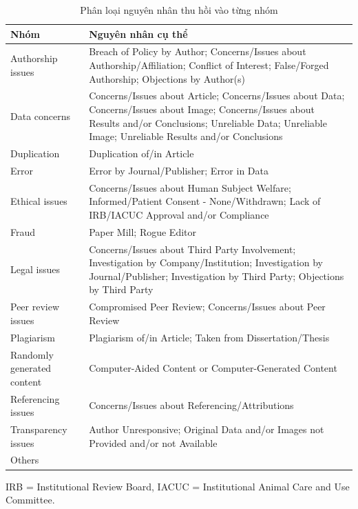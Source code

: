 \begin{table}[H]
\centering
\caption{Phân loại nguyên nhân thu hồi vào từng nhóm}
\label{tab:reason_category}
\small
\begin{tabularx}{\textwidth}{>{\hsize=0.28\hsize\raggedright\arraybackslash}X >{\hsize=1.72\hsize\raggedright\arraybackslash}X}
\toprule
\textbf{Nhóm} & \textbf{Nguyên nhân cụ thể} \\
\midrule
Authorship issues & Breach of Policy by Author; Concerns/Issues about Authorship/Affiliation; Conflict of Interest; False/Forged Authorship; Objections by Author(s) \\
\addlinespace
Data concerns & Concerns/Issues about Article; Concerns/Issues about Data; Concerns/Issues about Image; Concerns/Issues about Results and/or Conclusions; Unreliable Data; Unreliable Image; Unreliable Results and/or Conclusions \\
\addlinespace
Duplication & Duplication of/in Article \\
\addlinespace
Error & Error by Journal/Publisher; Error in Data \\
\addlinespace
Ethical issues & Concerns/Issues about Human Subject Welfare; Informed/Patient Consent - None/Withdrawn; Lack of IRB/IACUC Approval and/or Compliance \\
\addlinespace
Fraud & Paper Mill; Rogue Editor \\
\addlinespace
Legal issues & Concerns/Issues about Third Party Involvement; Investigation by Company/Institution; Investigation by Journal/Publisher; Investigation by Third Party; Objections by Third Party \\
\addlinespace
Peer review issues & Compromised Peer Review; Concerns/Issues about Peer Review \\
\addlinespace
Plagiarism & Plagiarism of/in Article; Taken from Dissertation/Thesis \\
\addlinespace
Randomly generated content & Computer-Aided Content or Computer-Generated Content \\
\addlinespace
Referencing issues & Concerns/Issues about Referencing/Attributions \\
\addlinespace
Transparency issues & Author Unresponsive; Original Data and/or Images not Provided and/or not Available \\
\addlinespace
Others & \\
\bottomrule
\end{tabularx}
\end{table}

{\noindent\robotocondensed\footnotesize IRB = Institutional Review Board, IACUC = Institutional Animal Care and Use Committee.}

